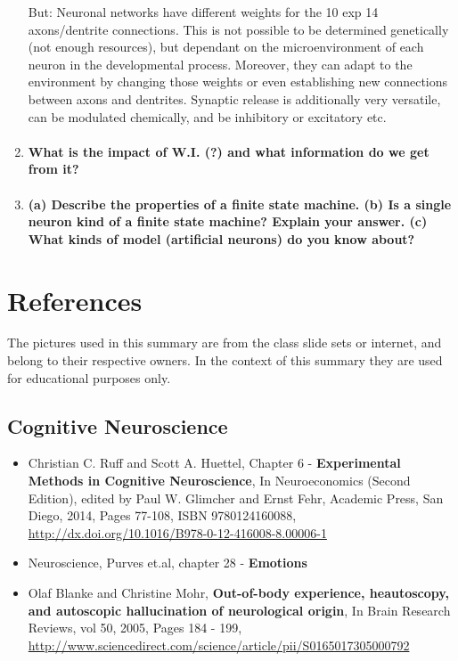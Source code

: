 \documentclass[12pt,article,oneside,a4paper]{memoir}
\begin{document}
\begin{enumerate}
	But: Neuronal networks have different weights for the 10 exp 14 axons/dentrite connections. This is not possible to be determined genetically (not enough resources), but dependant on the microenvironment of each neuron in the developmental process. Moreover, they can adapt to the environment by changing those weights or even establishing new connections between axons and dentrites.
	Synaptic release is additionally very versatile, can be modulated chemically, and be inhibitory or excitatory etc.

\item \paragraph{What is the impact of W.I. (?) and what information do we get from it?}

\item \paragraph{ (a) Describe the properties of a finite state machine. (b) Is a single neuron kind of  a finite state machine? Explain your answer. (c) What kinds of model (artificial neurons) do you know about?}
\end{enumerate}




\newpage

\section{References}
The pictures used in this summary are from the class slide sets or internet, and belong to their respective owners. In the context of this summary they are used for educational purposes only.

\subsection{Cognitive Neuroscience}
\begin{itemize}
\item Christian C. Ruff and Scott A. Huettel, Chapter 6 - \textbf{Experimental Methods in Cognitive Neuroscience}, In Neuroeconomics (Second Edition), edited by Paul W. Glimcher and Ernst Fehr, Academic Press, San Diego, 2014, Pages 77-108, ISBN 9780124160088, \url{http://dx.doi.org/10.1016/B978-0-12-416008-8.00006-1}
\item Neuroscience, Purves et.al, chapter 28 - \textbf{Emotions}
\item Olaf Blanke and Christine Mohr, \textbf{Out-of-body experience, heautoscopy, and autoscopic hallucination of neurological origin}, In Brain Research Reviews, vol 50, 2005, Pages 184 - 199, \url{http://www.sciencedirect.com/science/article/pii/S0165017305000792}
\end{itemize}
\end{document}
